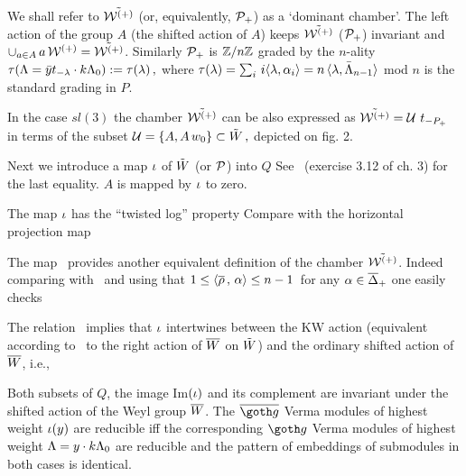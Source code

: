 We shall refer to $\tilde{{\cal W}^{(+)}}$ (or, equivalently, ${\cal P}_+$) as a
`dominant chamber'. The left action of the group $A$ (the shifted
action of $A$) keeps  $\tilde{{\cal W}^{(+)}}$ (${\cal P}_+$)  invariant and $\cup_{a\in
A} \, a\, {\cal W}^{(+)}= \tilde{{\cal W}^{(+)}}$. Similarly ${\cal P}_+$ is $\Bbb Z/n
\Bbb Z$ graded by the $n$-ality $\tau(\Lambda=\bar y t_{-\lambda}\cdot k \Lambda_0):=
\tau(\lambda)\,,$ where $\tau(\lambda)=\sum_i\, i \langle \lambda, \alpha_i\rangle=  n\,
\langle \lambda, \bar{\Lambda}_{n-1}\rangle$ mod $n$ is the standard grading in $P$.
\medskip
 
In the case $sl(3)$ the chamber $\tilde{{\cal W}^{(+)}}$ can be also expressed
as $\tilde{{\cal W}^{(+)}}= {\cal U}\ t_{- P_+} $ in terms of the subset ${\cal U}=\{ A, A\,
w_0\}\subset \tilde W\,,$ depicted on fig. 2. 

\medskip

Next we introduce a map $ \iota$ of $\tilde W$ (or ${\cal P}$)  into $Q$ 
%
\eqn\Ib{
 \iii: \tW\ni y=\by t_{-\zl} \
                                \mapsto \
     n\,\zl + \by^{-1}\cdot 0=n\,\zl \ -
         \!\!\sum_{_{
          \zb>0\,,\ \by(\zb)<0 }}\!\!\beta \,\in Q\,.
}
%
See \K\  (exercise 3.12 of  ch. 3) for the last equality.
$A$ is mapped by $\iota$ to zero.

 
 The map $\iota$ has the ``twisted log'' property
%
\eqn{}
%
Compare with the horizontal projection map 
%
\eqn{}


The map \Ib\ provides another equivalent definition of
the chamber $\tilde{{\cal W}^{(+)}}$. Indeed comparing with \Id\ and
using that $1\le \langle \overline{\rho}\,, \, \alpha
\rangle\le n-1\,$ for any $ \alpha\in \overline\Delta_+$ one easily checks
%
\eqn{}
%


The relation \tlg\   implies that $\iota$ intertwines between the
KW action  (equivalent according to \Ia\ to the right action of
$\overline W$ on $\tilde W$) and the ordinary shifted action  of $\overline W$, i.e.,
%
\eqn{}
%

Both subsets of $Q$, the image Im$(\iota)$ and its complement
are invariant  under the shifted action of the Weyl group $\overline W$. 
The $\bgo$ Verma modules of highest weight $\iota(y)$ are
reducible iff the corresponding $\go$  Verma modules of highest
weight $\Lambda=y\cdot k\Lambda_0$ are reducible and the pattern of
embeddings of submodules in both cases is identical.

